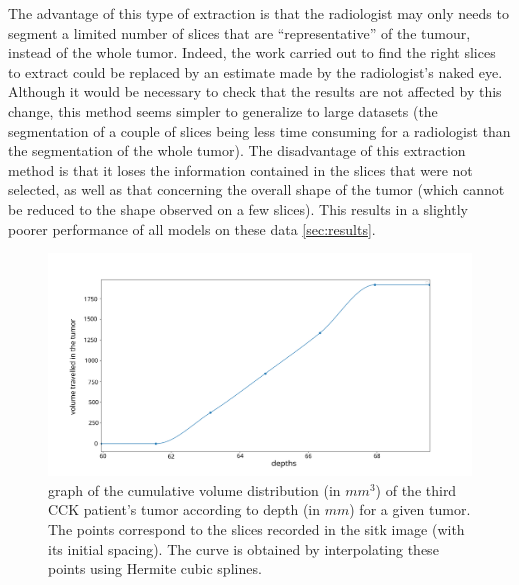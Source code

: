 \documentclass[preprint,12pt]{elsarticle}
\begin{document}
\indent The advantage of this type of extraction is that the radiologist may only needs to segment a limited number of slices that are “representative” of the tumour, instead of the whole tumor. Indeed, the work carried out to find the right slices to extract could be replaced by an estimate made by the radiologist's naked eye. Although it would be necessary to check that the results are not affected by this change, this method seems simpler to generalize to large datasets (the segmentation of a couple of slices being less time consuming for a radiologist than the segmentation of the whole tumor). The disadvantage of this extraction method is that it loses the information contained in the slices that were not selected, as well as that concerning the overall shape of the tumor (which cannot be reduced to the shape observed on a few slices). This results in a slightly poorer performance of all models on these data \ref{sec:results}.

\begin{figure}[tbp]
    \centering
    \includegraphics[scale = 0.25]{./images/plot_depth_volume_2.png}
    \caption{graph of the cumulative volume distribution (in $mm^3$) of the third CCK patient's tumor according to depth (in $mm$) for a given tumor. The points correspond to the slices recorded in the sitk image (with its initial spacing). The curve is obtained by interpolating these points using Hermite cubic splines.}
    \label{fig:depth_volume}
\end{figure}
\end{document}

